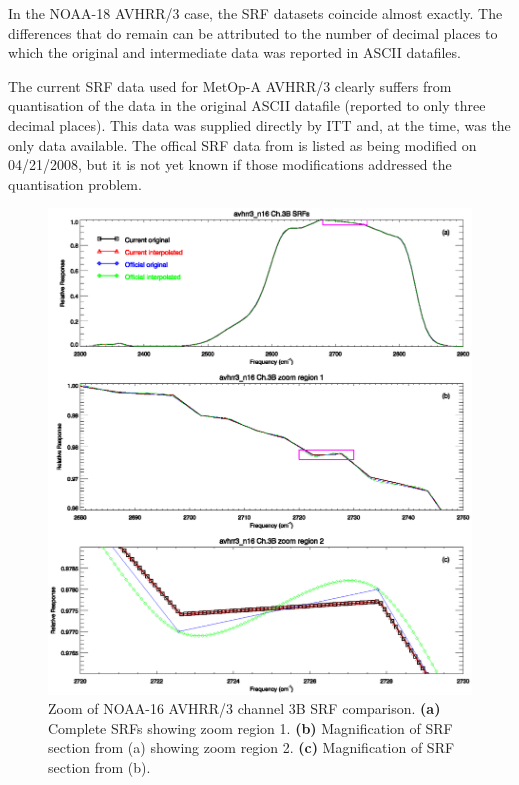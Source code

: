 In the NOAA-18 AVHRR/3 case, the SRF datasets coincide almost exactly. The differences that do remain can be attributed to the number of decimal places to which the original and intermediate data was reported in ASCII datafiles.

The current SRF data used for MetOp-A AVHRR/3 clearly suffers from quantisation of the data in the original ASCII datafile (reported to only three decimal places). This data was supplied directly by ITT \citep{Sullivan_avhrr3_metop-a_srf} and, at the time, was the only data available. The offical SRF data from \citet{NESDIS_AVHRR_SRFs} is listed as being modified on 04/21/2008, but it is not yet known if those modifications addressed the quantisation problem.

\begin{figure}[htp]
  \centering
  \includegraphics[scale=1]{graphics/zoom/avhrr3_n16.ch3.srf.zoom.eps}
  \caption{Zoom of NOAA-16 AVHRR/3 channel 3B SRF comparison. \textbf{(a)} Complete SRFs showing zoom region 1. \textbf{(b)} Magnification of SRF section from (a) showing zoom region 2.  \textbf{(c)} Magnification of SRF section from (b).}
  \label{fig:avhrr3_n16.ch3.srf.zoom}
\end{figure}

